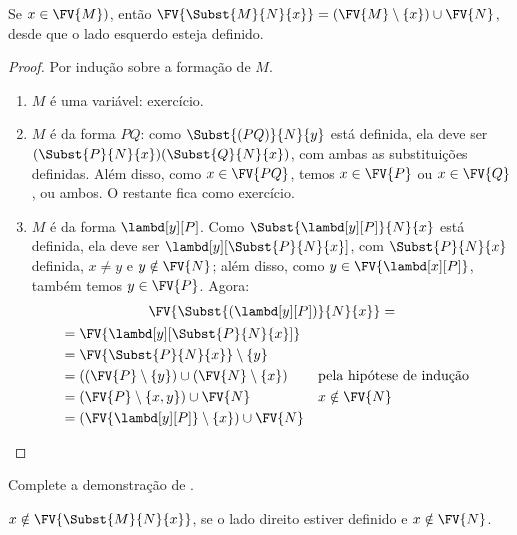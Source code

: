 \documentclass[../../../include/open-logic-section]{subfiles}
\begin{document}
\begin{thm} 
  Se $x \in \FV{M})$, então $\FV{\Subst{M}{N}{x}} = (\FV{M} \setminus
  \{x\}) \cup \FV{N}$, desde que o lado esquerdo esteja definido.
\end{thm}

\begin{proof}
  Por indução sobre a formação de $M$.
  \begin{enumerate}
  \item $M$ é uma variável: exercício.
  \item $M$ é da forma $PQ$: como
    $\Subst{(PQ)}{N}{y}$ está definida, ela deve ser
    $(\Subst{P}{N}{x})(\Subst{Q}{N}{x})$, com ambas as substituições
    definidas. Além disso, como $x \in \FV{PQ}$, temos $x \in \FV{P}$ ou
    $x \in \FV{Q}$, ou ambos. O restante fica como exercício.
  \item $M$ é da forma $\lambd[y][P]$. Como
    $\Subst{\lambd[y][P]}{N}{x}$ está definida, ela deve ser
    $\lambd[y][\Subst{P}{N}{x}]$, com $\Subst{P}{N}{x}$
    definida, $x \neq y$ e $y \notin \FV{N}$; além disso, como $y \in
    \FV{\lambd[x][P]}$, também temos $y \in \FV{P}$. Agora:
    \begin{multline*}
      \FV{\Subst{(\lambd[y][P])}{N}{x}} = \\
      \begin{aligned}
      & = \FV{\lambd[y][\Subst{P}{N}{x}]} \\
      & = \FV{\Subst{P}{N}{x}} \setminus \{y\} \\
      & = ((\FV{P} \setminus \{y\}) \cup (\FV{N} \setminus \{x\})
       && \text{pela hipótese de indução} \\
      & = (\FV{P} \setminus \{x, y\}) \cup \FV{N}
       && x \notin \FV{N} \\
      & = (\FV{\lambd[y][P]} \setminus \{x\}) \cup \FV{N}
      \end{aligned}
      \end{multline*}
  \end{enumerate}
\end{proof}

\begin{prob}
  Complete a demonstração de .
\end{prob}

\begin{thm}
  $x \notin \FV{\Subst{M}{N}{x}}$, se o lado direito estiver definido e
  $x \notin \FV{N}$.
\end{thm}
\end{document}

